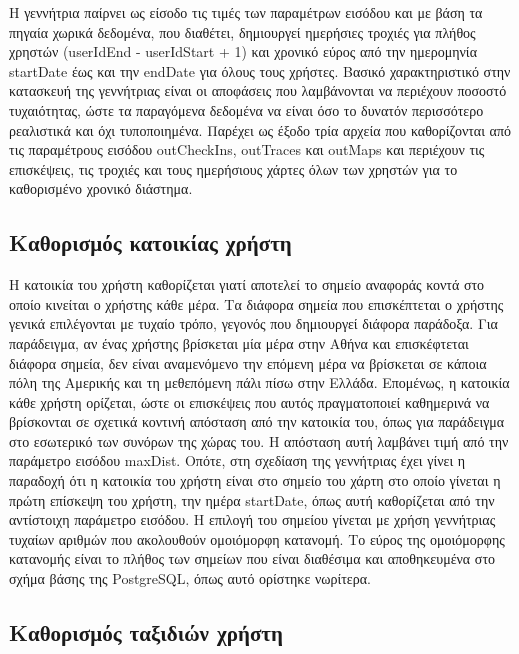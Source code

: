 Η γεννήτρια παίρνει ως είσοδο τις τιμές των παραμέτρων εισόδου και με βάση τα πηγαία χωρικά δεδομένα, που διαθέτει, 
δημιουργεί ημερήσιες τροχιές για πλήθος χρηστών (userIdEnd - userIdStart + 1) και χρονικό εύρος από την ημερομηνία startDate έως και την endDate 
για όλους τους χρήστες. Βασικό χαρακτηριστικό στην κατασκευή της γεννήτριας είναι οι αποφάσεις που λαμβάνονται να περιέχουν ποσοστό τυχαιότητας, ώστε 
τα παραγόμενα δεδομένα να είναι όσο το δυνατόν περισσότερο ρεαλιστικά και όχι τυποποιημένα. 
Παρέχει ως έξοδο τρία αρχεία που καθορίζονται από τις παραμέτρους εισόδου outCheckIns, outTraces και outMaps και περιέχουν 
τις επισκέψεις, τις τροχιές και τους ημερήσιους χάρτες όλων των χρηστών για το καθορισμένο χρονικό διάστημα. 

\subsection{Καθορισμός κατοικίας χρήστη}

Η κατοικία του χρήστη καθορίζεται γιατί αποτελεί το σημείο αναφοράς κοντά στο οποίο κινείται ο χρήστης κάθε μέρα. Τα διάφορα σημεία που επισκέπτεται 
ο χρήστης γενικά επιλέγονται με τυχαίο τρόπο, γεγονός που δημιουργεί διάφορα παράδοξα. Για παράδειγμα, αν ένας χρήστης 
βρίσκεται μία μέρα στην Αθήνα και επισκέφτεται διάφορα σημεία, δεν είναι αναμενόμενο την επόμενη μέρα να βρίσκεται σε κάποια πόλη της Αμερικής και τη μεθεπόμενη πάλι πίσω 
στην Ελλάδα. Επομένως, η κατοικία κάθε χρήστη ορίζεται, ώστε οι επισκέψεις που αυτός πραγματοποιεί καθημερινά να βρίσκονται σε σχετικά κοντινή απόσταση 
από την κατοικία του, όπως για παράδειγμα στο εσωτερικό των συνόρων της χώρας του. Η απόσταση αυτή λαμβάνει τιμή από την παράμετρο εισόδου maxDist. 
Οπότε, στη σχεδίαση της γεννήτριας έχει γίνει η παραδοχή ότι η κατοικία του χρήστη είναι στο σημείο του χάρτη στο οποίο γίνεται η πρώτη επίσκεψη του 
χρήστη, την ημέρα startDate, όπως αυτή καθορίζεται από την αντίστοιχη παράμετρο εισόδου. Η επιλογή του σημείου γίνεται με χρήση γεννήτριας τυχαίων αριθμών 
που ακολουθούν ομοιόμορφη κατανομή. Το εύρος της ομοιόμορφης κατανομής είναι το πλήθος των σημείων που είναι διαθέσιμα και αποθηκευμένα στο σχήμα βάσης 
της PostgreSQL, όπως αυτό ορίστηκε νωρίτερα.

\subsection{Καθορισμός ταξιδιών χρήστη}

